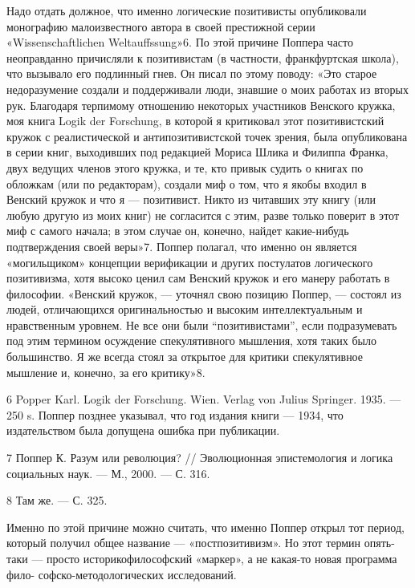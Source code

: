 \documentclass[11pt,a4paper]{article}
\begin{document}
Надо отдать должное, что именно логические позитивисты опубликовали монографию
малоизвестного автора в своей престижной серии «Wissenschaftlichen
Weltauffssung»6. По этой причине Поппера часто неоправданно причисляли к
позитивистам (в частности, франкфуртская школа), что вызывало его подлинный
гнев. Он писал по этому поводу: «Это старое недоразумение создали и
поддерживали люди, знавшие о моих работах из вторых рук. Благодаря терпимому
отношению некоторых участников Венского кружка, моя книга Logik der
Forschung, в которой я критиковал этот позитивистский кружок с реалистической
и антипозитивистской точек зрения, была опубликована в серии книг, выходивших
под редакцией Мориса Шлика и Филиппа Франка, двух ведущих членов этого кружка,
и те, кто привык судить о книгах по обложкам (или по редакторам), создали
миф о том, что я якобы входил в Венский кружок и что я — позитивист.  Никто из
читавших эту книгу (или любую другую из моих книг) не согласится с этим, разве
только поверит в этот миф с самого начала; в этом случае он, конечно, найдет
какие-нибудь подтверждения своей веры»7. Поппер полагал, что именно он
является «могильщиком» концепции верификации и других постулатов логического
позитивизма, хотя высоко ценил сам Венский кружок и его манеру работать в
философии. «Венский кружок, — уточнял свою позицию Поппер, — состоял из людей,
отличающихся оригинальностью и высоким интеллектуальным и нравственным
уровнем. Не все они были “позитивистами”, если подразумевать под этим
термином осуждение спекулятивного мышления, хотя таких было большинство. Я
же всегда стоял за открытое для критики спекулятивное мышление и, конечно,
за его критику»8.

6 Popper Karl. Logik der Forschung. Wien. Verlag von Julius Springer.  1935. —
250 s. Поппер позднее указывал, что год издания книги — 1934, что
издательством была допущена ошибка при публикации.

7 Поппер К. Разум или революция? // Эволюционная эпистемология и логика
социальных наук. — М., 2000. — С. 316.

8 Там же. — С. 325.

Именно по этой причине можно считать, что именно Поппер открыл тот период,
который получил общее название — «постпозитивизм». Но этот термин опять-таки
— просто историкофилософский «маркер», а не какая-то новая программа фило-
софско-методологических исследований.
\end{document}
